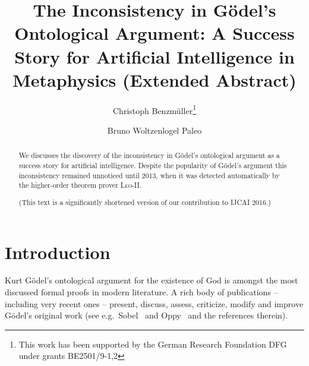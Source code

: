 \documentclass{llncs}
\begin{document}
\title{The Inconsistency in G\"odel's Ontological Argument: A Success
  Story for Artificial Intelligence in Metaphysics (Extended Abstract)}
\author{Christoph Benzm\"uller\thanks{This work has been supported by
    the German Research Foundation DFG under grants BE2501/9-1,2} \and Bruno Woltzenlogel Paleo 
}


\maketitle            



\begin{abstract}
  We discusses the discovery of the inconsistency in G\"odel's
  ontological argument as a success story for artificial
  intelligence. Despite the popularity of G\"odel's argument this
  inconsistency remained unnoticed until 2013, when it was detected
  automatically by the higher-order theorem prover
  \textsc{Leo-II}.  %
  
  (This text is a significantly shortened version of our contribution to IJCAI 2016.)
\end{abstract}


\section{Introduction}\label{sec:introduction}
Kurt G\"{o}del's ontological
argument for the existence of God \cite{GoedelNotes,ScottNotes} is
amongst the most discussed formal proofs in modern literature. A rich
body of publications -- including very recent ones -- present,
discuss, assess, criticize, modify and improve G\"{o}del's original
work (see e.g.~Sobel~\cite{sobel2004logic} and Oppy~\cite{sep-ontological-arguments} and the
references therein). 
\end{document}
